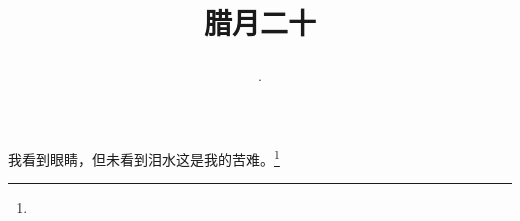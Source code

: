 \title{\date[d=30,m=1,y=2024][year:cn-y,年,month:cn,day:cn,日,·,weekday]·腊月二十 }
我看到眼睛，但未看到泪水这是我的苦难。\footnote{ }

